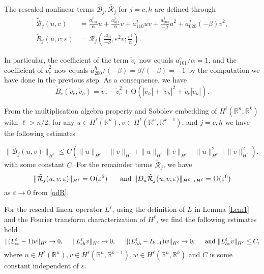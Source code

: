 \documentclass[10pt]{article}
\newcommand{\R}{\mathbb{R}}
\newcommand{\rmO}{\mathrm{O}}
\newcommand{\eps}{\varepsilon}
\newcommand{\B}{\mathcal{B}}
\newcommand{\Rm}{\mathcal{R}}
\begin{document}
The rescaled nonlinear terms $\tilde{\B_j}, \tilde{\Rm_j}$ for $j=c,h$ are defined through 
\begin{align*}
\tilde{\B}_j(u,v)&=\frac{a^j_{101}}{\alpha}  u+\frac{a^j_{011}}{\alpha} v+a^j_{110}uv + \frac{a^j_{200}}{-\beta}u^2+a^j_{020}(-\beta)v^2 ,\\
\tilde{R}_j ( u,v;\eps)&=\Rm_j \left(\frac{\eps^2u}{-\beta},\eps^2v;\frac{\eps^2}{\alpha}\right).
\end{align*}

In particular, the coefficient of the term $\tilde{v}_c$ now equals $ a_{101}^c/\alpha=1$, and the coefficient of $\tilde{v}_c^2$ now equals $a_{200}^h/(-\beta)=\beta/(-\beta)=-1$ by the computation we have done in the previous step. As a consequence, we have 
\[
\tilde{B}_c(\tilde{v}_c,\tilde{v}_h) = \tilde{v}_c-\tilde{v}_c^2 + \rmO(|\tilde{v}_h|+|\tilde{v} _h|^2+\tilde{v}_c|\tilde{v} _h|).
\] 



From the multiplication algebra property and Sobolev embedding of $H^\ell(\R^n,\R^k)$ with $\ell>n/2$, for any $u\in H^\ell(\R^n), v\in H^\ell(\R^n,\R^{k-1})$, and $j=c,h$ we have the following estimates

\begin{equation}\label{Blest}
\|\tilde{\B}_j(u,v)\|_{H^\ell} \le C\left(\|u\|_{H^\ell}+\|v\|_{H^\ell}+\|u\|_{H^\ell}\|v\|_{H^\ell} +\|u\|_{H^\ell}^2+\|v\|^2_{H^\ell}\right),
\end{equation}
with some constant $C$. For the remainder terms $\tilde{\Rm}_j$, we have 
\begin{equation} \label{Nlest}
 \|\tilde{\Rm}_j(u,v;\eps)\|_{H^\ell} = \rmO(\eps^6) \hspace{0.2in}\text{ and } \|D_u \tilde{\Rm}_j(u,v;\eps)\|_{H^\ell \to H^\ell} = \rmO(\eps^6)
\end{equation}
as $\eps \to 0$ from \eqref{odR}.

 For the rescaled linear operator $L^\eps$, using the definition of $L$ in Lemma \ref{Lem1} and the Fourier transform characterization of $H^\ell$, we find the following estimates hold
\begin{equation}\label{Liest}
\|(L^\eps_{cc} - 1)u \|_{H^\ell} \to 0, \hspace{0.2in}\|L^\eps_{ch}v \|_{H^\ell} \to 0, \hspace{0.2in}\|(L^\eps_{hh}-I_{k-1})w \|_{H^\ell} \to 0, \hspace{0.2in} \text{and }\|L^\eps_{hc}v \|_{H^\ell} \le C,
\end{equation}
where $u \in H^\ell(\R^n), v\in H^\ell(\R^n,\R^{k-1}), w\in H^\ell(\R^n,\R^k)$ and $C$ is some constant independent of $\eps$. 
\end{document}
